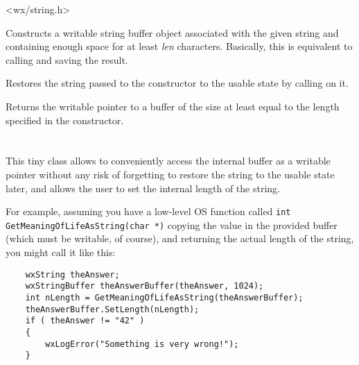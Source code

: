 <wx/string.h>


\label{wxstringbufferctor}


Constructs a writable string buffer object associated with the given string
and containing enough space for at least {\it len} characters. Basically, this
is equivalent to calling  and
saving the result.

\label{wxstringbufferdtor}


Restores the string passed to the constructor to the usable state by calling 
 on it.

\label{wxstringbufferwxchar}


Returns the writable pointer to a buffer of the size at least equal to the
length specified in the constructor.



\section{}\label{wxstringbufferlength}

This tiny class allows to conveniently access the  
internal buffer as a writable pointer without any risk of forgetting to restore
the string to the usable state later, and allows the user to set the internal
length of the string.

For example, assuming you have a low-level OS function called 
{\tt int GetMeaningOfLifeAsString(char *)} copying the value in the provided
buffer (which must be writable, of course), and returning the actual length
of the string, you might call it like this:

\begin{verbatim}
    wxString theAnswer;
    wxStringBuffer theAnswerBuffer(theAnswer, 1024);
    int nLength = GetMeaningOfLifeAsString(theAnswerBuffer);
    theAnswerBuffer.SetLength(nLength);
    if ( theAnswer != "42" )
    {
        wxLogError("Something is very wrong!");
    }
\end{verbatim}

